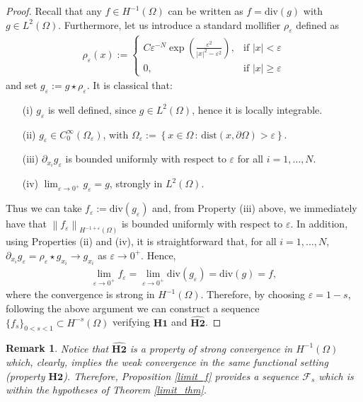 \documentclass[reqno,twoside]{amsart}
\newtheorem{remark}[theorem]{Remark}
\numberwithin{equation}{section}
\newcommand{\norm}[2]{{\left\|#1\right\|}_{#2}}
\begin{document}
\begin{proof}
Recall that any $f\in H^{-1}(\Omega)$ can be written as $f=\textrm{div}(g)$ with $g\in L^2(\Omega)$. Furthermore, let us introduce a standard mollifier $\rho_\varepsilon$ defined as 
\begin{align*}
	\rho_\varepsilon(x):= \begin{cases}
	C\varepsilon^{-N}\exp\left(\frac{\varepsilon^2}{|x|^2-\varepsilon^2}\right), & \textrm{if } |x|<\varepsilon
	\\
	0, & \textrm{if } |x|\geq\varepsilon
	\end{cases}
\end{align*}
and set $g_\varepsilon:=g\star\rho_\varepsilon$. It is classical that:
\begin{itemize}
		\item[(i)] $g_\varepsilon$ is well defined, since $g\in L^2(\Omega)$, hence it is locally integrable.
		\item[(ii)] $g_\varepsilon\in C_0^\infty(\Omega_\varepsilon)$, with $\Omega_\varepsilon:=\left\{x\in\Omega\,:\, \textrm{dist}(x,\partial\Omega)>\varepsilon\right\}.$
		\item[(iii)] $\partial_{x_i}g_\varepsilon$ is bounded uniformly with respect to $\varepsilon$ for all $i=1,\ldots,N$.
		\item[(iv)] $\lim_{\varepsilon\to 0^+} g_\varepsilon = g$, strongly in $L^2(\Omega)$. 
\end{itemize}
	
Thus we can take $f_\varepsilon:=\textrm{div}(g_\varepsilon)$ and, from Property (iii) above, we immediately have that $\norm{f_\varepsilon}{H^{-1+\varepsilon}(\Omega)}$ is bounded uniformly with respect to $\varepsilon$. In addition, using Properties (ii) and (iv), it is straightforward that, for all $i=1,\ldots,N$, $\partial_{x_i} g_\varepsilon = \rho_\varepsilon\star g_{x_i} \to g_{x_i}$ as $\varepsilon\to 0^+$. Hence, 
\begin{align*}
	\lim_{\varepsilon\to 0^+}f_\varepsilon = \lim_{\varepsilon\to 0^+}\textrm{div}(g_\varepsilon) = \textrm{div}(g) = f,
\end{align*}
where the convergence is strong in $H^{-1}(\Omega)$. Therefore, by choosing $\varepsilon=1-s$, following the above argument we can construct a sequence $\{f_s\}_{0<s<1}\subset H^{-s}(\Omega)$ verifying $\textbf{H1}$ and $\widehat{\textbf{H2}}$.
\end{proof}

\begin{remark}
	Notice that $\widehat{\textbf{H2}}$ is a property of strong convergence in $H^{-1}(\Omega)$ which, clearly, implies the weak convergence in the same functional setting (property $\textbf{H2}$). Therefore, Proposition \ref{limit_f} provides a sequence $\mathcal{F}_s$ which is within the hypotheses of Theorem \ref{limit_thm}.
\end{remark}
\end{document}
